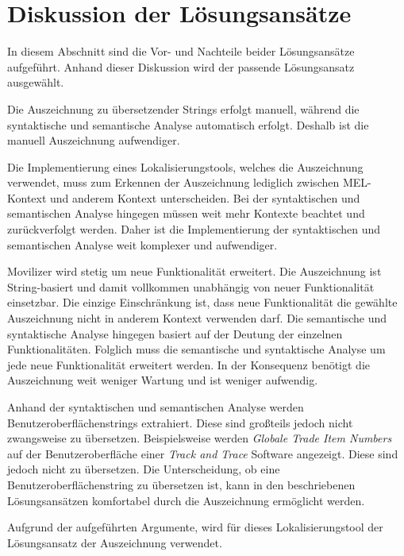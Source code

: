 \section{Diskussion der Lösungsansätze}
In diesem Abschnitt sind die Vor- und Nachteile beider Lösungsansätze aufgeführt. Anhand dieser Diskussion wird der passende Lösungsansatz ausgewählt.
\par
Die Auszeichnung zu übersetzender Strings erfolgt manuell, während die syntaktische und semantische Analyse automatisch erfolgt. Deshalb ist die manuell Auszeichnung aufwendiger.
\par
Die Implementierung eines Lokalisierungstools, welches die Auszeichnung verwendet, muss zum Erkennen der Auszeichnung lediglich zwischen \ac{MEL}-Kontext und anderem Kontext unterscheiden. Bei der syntaktischen und semantischen Analyse hingegen müssen weit mehr Kontexte beachtet und zurückverfolgt werden. Daher ist die Implementierung der syntaktischen und semantischen Analyse weit komplexer und aufwendiger.
\par
Movilizer wird stetig um neue Funktionalität erweitert. Die Auszeichnung ist String-basiert und damit vollkommen unabhängig von neuer Funktionalität einsetzbar. Die einzige Einschränkung ist, dass neue Funktionalität die gewählte Auszeichnung nicht in anderem Kontext verwenden darf. Die semantische und syntaktische Analyse hingegen basiert auf der Deutung der einzelnen Funktionalitäten. Folglich muss die semantische und syntaktische Analyse um jede neue Funktionalität erweitert werden. In der Konsequenz benötigt die Auszeichnung weit weniger Wartung und ist weniger aufwendig.
\par
Anhand der syntaktischen und semantischen Analyse werden Benutzeroberflächenstrings extrahiert. Diese sind großteils jedoch nicht zwangsweise zu übersetzen. Beispielsweise werden \textit{Globale Trade Item Numbers} auf der Benutzeroberfläche einer \textit{Track and Trace} Software angezeigt. Diese sind jedoch nicht zu übersetzen. Die Unterscheidung, ob eine Benutzeroberflächenstring zu übersetzen ist, kann in den beschriebenen Lösungsansätzen komfortabel durch die Auszeichnung ermöglicht werden.
\par
Aufgrund der aufgeführten Argumente, wird für dieses Lokalisierungstool der Lösungsansatz der Auszeichnung verwendet.